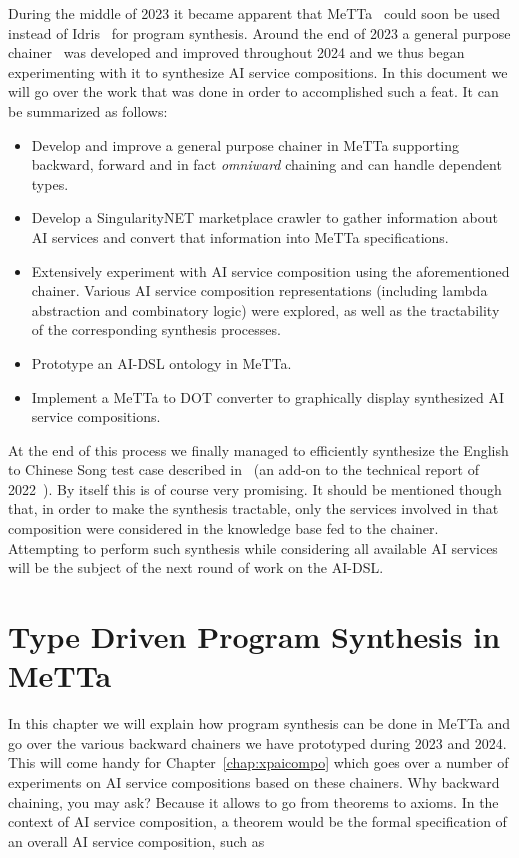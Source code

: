 \documentclass[]{report}
\begin{document}
During the middle of 2023 it became apparent that MeTTa~\cite{MeTTa}
could soon be used instead of Idris~\cite{Idris} for program
synthesis.  Around the end of 2023 a general purpose
chainer~\cite{Chaining} was developed and improved throughout 2024 and
we thus began experimenting with it to synthesize AI service
compositions.  In this document we will go over the work that was done
in order to accomplished such a feat.  It can be summarized as
follows:
\begin{itemize}
\item Develop and improve a general purpose chainer in MeTTa
  supporting backward, forward and in fact \emph{omniward} chaining
  and can handle dependent types.
\item Develop a SingularityNET marketplace crawler to gather
  information about AI services and convert that information into
  MeTTa specifications.
\item Extensively experiment with AI service composition using the
  aforementioned chainer.  Various AI service composition
  representations (including lambda abstraction and combinatory logic)
  were explored, as well as the tractability of the corresponding
  synthesis processes.
\item Prototype an AI-DSL ontology in MeTTa.
\item Implement a MeTTa to DOT converter to graphically display
  synthesized AI service compositions.
\end{itemize}
At the end of this process we finally managed to efficiently
synthesize the English to Chinese Song test case described
in~\cite{AIDSLService2023} (an add-on to the technical report of
2022~\cite{AIDSLReport2022}).  By itself this is of course very
promising.  It should be mentioned though that, in order to make the
synthesis tractable, only the services involved in that composition
were considered in the knowledge base fed to the chainer.  Attempting
to perform such synthesis while considering all available AI services
will be the subject of the next round of work on the AI-DSL.

\chapter{Type Driven Program Synthesis in MeTTa}
\label{chap:chainers}
In this chapter we will explain how program synthesis can be done in
MeTTa and go over the various backward chainers we have prototyped
during 2023 and 2024.  This will come handy for
Chapter~\ref{chap:xpaicompo} which goes over a number of experiments
on AI service compositions based on these chainers.  Why backward
chaining, you may ask?  Because it allows to go from theorems to
axioms.  In the context of AI service composition, a theorem would be
the formal specification of an overall AI service composition, such
as\\
\end{document}
